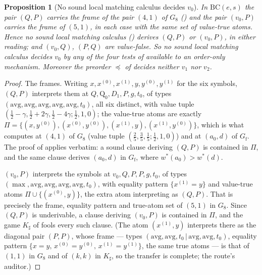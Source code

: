 \documentclass[11pt]{article}
\theoremstyle{plain}
\newtheorem{proposition}[theorem]{Proposition}
\theoremstyle{definition}
\begin{document}
\begin{proposition}[No sound local matching calculus decides
$v_0$]\label{prop:bc-lmc}
In $\mathrm{BC}(e,s)$ the pair $(Q,P)$ carries the frame of the pair
$(4,1)$ of $G_8$ () and the
pair $(v_0,P)$ carries the frame of $(5,1)$, in each case with the same
set of value-true atoms. Hence no sound local matching calculus
() derives $(Q,P)$ or $(v_0,P)$, in either reading; and
$(v_0,Q)$, $(P,Q)$ are value-false. So no sound local matching calculus
decides $v_0$ by any of the four tests of 
available to an order-only mechanism. Moreover the preorder $\preceq$ of
 decides neither $v_1$ nor $v_2$.
\end{proposition}

\begin{proof}
The frames. Writing $x,x^{(0)},x^{(1)},y,y^{(0)},y^{(1)}$ for the six
symbols, $(Q,P)$ interprets them at $Q,\mathrm{Q}_0,D_1,P,g,t_0$, of types
$(\mathrm{avg},\mathrm{avg},\mathrm{avg},\mathrm{avg},\mathrm{avg},t_0)$,
all six distinct, with value tuple
$(\tfrac12-\gamma,\tfrac12+2\gamma,\tfrac12-4\gamma;\tfrac12,1,0)$; the
value-true atoms are exactly
$\Pi=\{(x,y^{(0)}),(x^{(0)},y^{(0)}),(x^{(1)},y),(x^{(1)},y^{(0)})\}$,
which is what  computes at $(4,1)$ of $G_8$
(value tuple $(\tfrac25,\tfrac35,\tfrac15;\tfrac12,1,0)$) and at
$(a_0,d)$ of $G_{\mathrm f}$. The proof of 
applies verbatim: a sound clause deriving $(Q,P)$ is contained in $\Pi$,
and the same clause derives $(a_0,d)$ in $G_{\mathrm f}$, where
$w^\ast(a_0)>w^\ast(d)$.

$(v_0,P)$ interprets the symbols at $v_0,Q,P,P,g,t_0$, of types
$(\max,\mathrm{avg},\mathrm{avg},\mathrm{avg},\mathrm{avg},t_0)$, with
equality pattern $\{x^{(1)}=y\}$ and value-true atoms
$\Pi\cup\{(x^{(0)},y)\}$, the extra atom interpreting as $(Q,P)$. That is
precisely the frame, equality pattern and true-atom set of $(5,1)$ in
$G_8$. Since $(Q,P)$ is underivable, a clause deriving $(v_0,P)$ is
contained in $\Pi$, and the game $K_\sharp$ of 
fools every such clause. (The atom $(x^{(1)},y)$ interprets there as the
diagonal pair $(P,P)$, whose frame --- types
$(\mathrm{avg},\mathrm{avg},t_0\,|\,\mathrm{avg},\mathrm{avg},t_0)$,
equality pattern $\{x=y,\,x^{(0)}=y^{(0)},\,x^{(1)}=y^{(1)}\}$, the same
true atoms --- is that of $(1,1)$ in $G_8$ and of $(k,k)$ in $K_\sharp$,
so the transfer is complete; the route's auditor.)


\end{proof}
\end{document}
